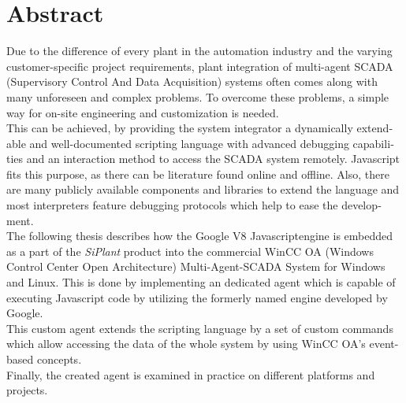 \chapter{Abstract}


\begin{english}
Due to the difference of every plant in the automation industry and the varying customer-specific project requirements, 
plant integration of multi-agent SCADA (Supervisory Control And Data Acquisition) systems often comes along with 
many unforeseen and complex problems. To overcome these problems, a simple way for on-site engineering and
customization is needed. \\

This can be achieved, by providing the system integrator a dynamically extendable and well-documented scripting language 
with advanced debugging capabilities and an interaction method to access the SCADA system remotely. Javascript fits this 
purpose, as there can be literature found online and offline. Also, there are many publicly available components and libraries
to extend the language and most interpreters feature debugging protocols which help to ease the development. \\

The following thesis describes how the Google V8 Javascriptengine is embedded as a part of the \textit{SiPlant} product 
into the commercial WinCC OA (Windows Control Center Open Architecture) Multi-Agent-SCADA System for Windows and Linux. 
This is done by implementing an dedicated agent which is capable of executing Javascript code by utilizing 
the formerly named engine developed by Google. \\

This custom agent extends the scripting language by a set of custom commands which allow accessing the data of the whole 
system by using WinCC OA's event-based concepts. \\

Finally, the created agent is examined in practice on different platforms and projects.
\end{english}

